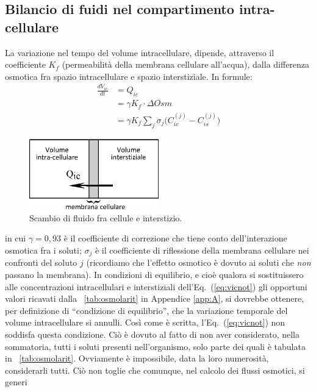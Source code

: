 \subsection{Bilancio di fuidi nel compartimento intra-cellulare}
La variazione nel tempo del volume intracellulare, dipende, attraverso il coefficiente $K_f$ (permeabilità della membrana cellulare all'acqua), dalla differenza osmotica fra spazio intracellulare e spazio interstiziale. In formule:
\begin{equation}\label{eq:vicnot}
	\begin{split}
	\frac{dV_{ic}}{dt} &= Q_{ic}\\
										 &= \gamma K_f \cdot \Delta Osm \\
	                   &= \gamma K_f \sum_j{\sigma_j\biggl(C_{ic}^{(j)}-C_{is}^{(j)}\biggr)}
	\end{split}
\end{equation}
\begin{figure}[htb]
	\centering
		\includegraphics[width=0.5\textwidth]{immagini/vol_ic.eps}
				\caption{Scambio di fluido fra cellule e interstizio.}
\end{figure}
in cui $\gamma=0,93$ è il coefficiente di correzione che tiene conto dell'interazione osmotica fra i soluti; $\sigma_j$ è il coefficiente di riflessione della membrana cellulare nei confronti del soluto $j$ (ricordiamo che l'effetto osmotico è dovuto ai soluti che \textit{non} passano la membrana).
In condizioni di equilibrio, e cioè qualora si sostituissero alle concentrazioni intracellulari e interstiziali dell'Eq.~(\ref{eq:vicnot}) gli opportuni valori ricavati dalla \tablename~\ref{tab:osmolarit} in Appendice \ref{app:A}, si dovrebbe ottenere, per definizione di ``condizione di equilibrio'', che la variazione temporale del volume intracellulare si annulli. Così come è scritta, l'Eq.~(\ref{eq:vicnot}) non soddisfa questa condizione. Ciò è dovuto al fatto di non aver considerato, nella sommatoria, tutti i soluti presenti nell'organismo, solo parte dei quali è tabulata in \tablename~\ref{tab:osmolarit}. Ovviamente è impossibile, data la loro numerosità, considerarli tutti. Ciò non toglie che comunque, nel calcolo dei flussi osmotici, si generi
